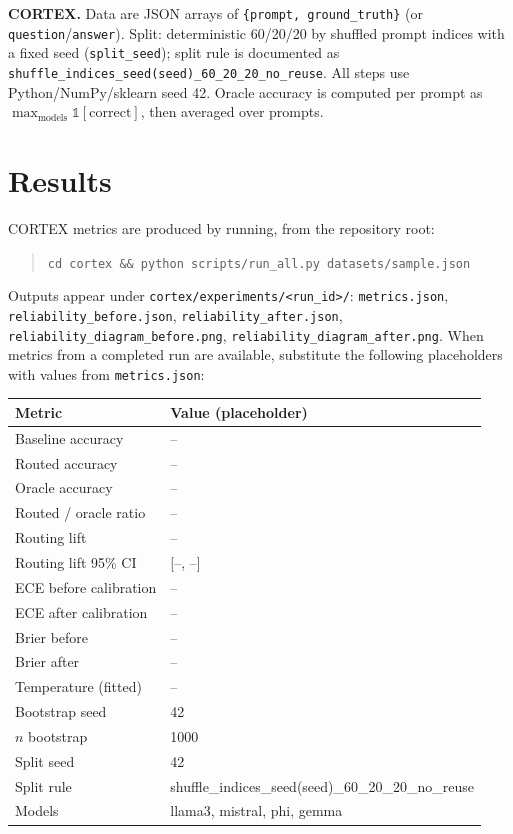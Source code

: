 \documentclass[11pt]{article}
\newcommand{\CORTEXbaseline}{--}      %
\newcommand{\CORTEXrouted}{--}        %
\newcommand{\CORTEXoracle}{--}        %
\newcommand{\CORTEXroutedOracle}{--}  %
\newcommand{\CORTEXlift}{--}          %
\newcommand{\CORTEXciLow}{--}         %
\newcommand{\CORTEXciHigh}{--}        %
\newcommand{\CORTEXeceBefore}{--}     %
\newcommand{\CORTEXeceAfter}{--}      %
\newcommand{\CORTEXbrierBefore}{--}    %
\newcommand{\CORTEXbrierAfter}{--}    %
\newcommand{\CORTEXtemperature}{--}    %
\newcommand{\CORTEXbootstrapSeed}{42}
\newcommand{\CORTEXnBootstrap}{1000}
\newcommand{\CORTEXsplitSeed}{42}
\newcommand{\CORTEXsplitRule}{shuffle\_indices\_seed(seed)\_60\_20\_20\_no\_reuse}
\newcommand{\CORTEXmodels}{llama3, mistral, phi, gemma}
\begin{document}
\textbf{CORTEX.} Data are JSON arrays of \texttt{\{prompt, ground\_truth\}} (or \texttt{question}/\texttt{answer}). Split: deterministic 60/20/20 by shuffled prompt indices with a fixed seed (\texttt{split\_seed}); split rule is documented as \texttt{shuffle\_indices\_seed(seed)\_60\_20\_20\_no\_reuse}. All steps use Python/NumPy/sklearn seed 42. Oracle accuracy is computed per prompt as $\max_{\mathrm{models}} \mathbb{1}[\mathrm{correct}]$, then averaged over prompts.

\section{Results}
\label{sec:results}

CORTEX metrics are produced by running, from the repository root:
\begin{quote}
\texttt{cd cortex \&\& python scripts/run\_all.py datasets/sample.json}
\end{quote}
Outputs appear under \texttt{cortex/experiments/<run\_id>/}: \texttt{metrics.json}, \texttt{reliability\_before.json}, \texttt{reliability\_after.json}, \texttt{reliability\_diagram\_before.png}, \texttt{reliability\_diagram\_after.png}. When metrics from a completed run are available, substitute the following placeholders with values from \texttt{metrics.json}:

\begin{center}
\begin{tabular}{ll}
\hline
Metric & Value (placeholder) \\
\hline
Baseline accuracy & \CORTEXbaseline \\
Routed accuracy & \CORTEXrouted \\
Oracle accuracy & \CORTEXoracle \\
Routed / oracle ratio & \CORTEXroutedOracle \\
Routing lift & \CORTEXlift \\
Routing lift 95\% CI & [\CORTEXciLow, \CORTEXciHigh] \\
ECE before calibration & \CORTEXeceBefore \\
ECE after calibration & \CORTEXeceAfter \\
Brier before & \CORTEXbrierBefore \\
Brier after & \CORTEXbrierAfter \\
Temperature (fitted) & \CORTEXtemperature \\
Bootstrap seed & \CORTEXbootstrapSeed \\
$n$ bootstrap & \CORTEXnBootstrap \\
Split seed & \CORTEXsplitSeed \\
Split rule & \CORTEXsplitRule \\
Models & \CORTEXmodels \\
\hline
\end{tabular}
\end{center}
\end{document}
